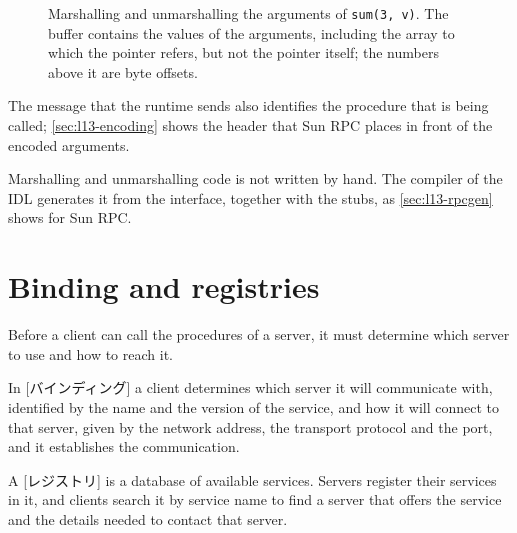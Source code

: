 \documentclass[../main.tex]{subfiles}
\begin{document}
\begin{figure}[htbp]
  \centering
  
  \caption{Marshalling and unmarshalling the arguments of
    \texttt{sum(3, v)}.  The buffer contains the values of the arguments,
    including the array to which the pointer refers, but not the pointer
    itself; the numbers above it are byte offsets.}
  \label{fig:l13-marshal}
\end{figure}

The message that the runtime sends also identifies the procedure that is
being called; \cref{sec:l13-encoding} shows the header that Sun RPC places
in front of the encoded arguments.

Marshalling and unmarshalling code is not written by hand.  The compiler
of the IDL generates it from the interface, together with the stubs, as
\cref{sec:l13-rpcgen} shows for Sun RPC.

\section{Binding and registries}
\label{sec:l13-binding}

Before a client can call the procedures of a server, it must determine
which server to use and how to reach it.

\begin{definition}[Binding]
  In [バインディング] a client determines which server it will
  communicate with, identified by the name and the version of the service,
  and how it will connect to that server, given by the network address,
  the transport protocol and the port, and it establishes the
  communication.
\end{definition}

\begin{definition}[Registry]
  A [レジストリ] is a database of available services.
  Servers register their services in it, and clients search it by service
  name to find a server that offers the service and the details needed to
  contact that server.
\end{definition}
\end{document}
